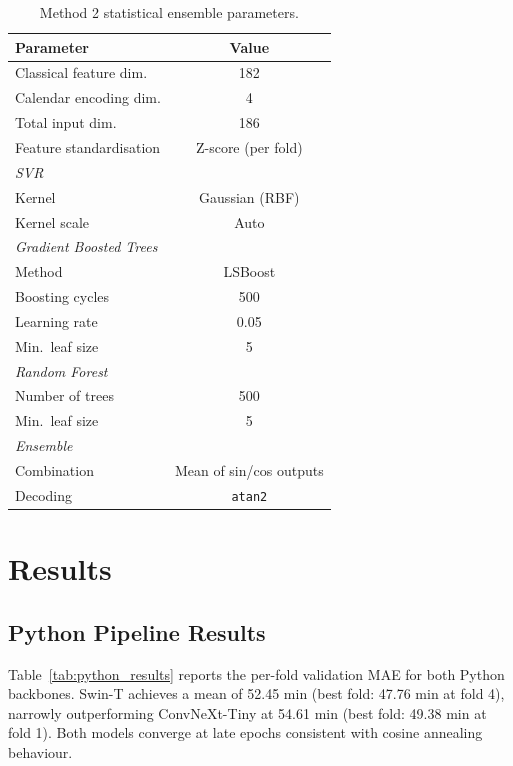 \documentclass[9pt, a4paper, twocolumn]{article}
\begin{document}
\begin{table}[H]
\centering
\footnotesize
\caption{Method 2 statistical ensemble parameters.}
\label{tab:m2_params}
\begin{tabular}{lc}
\toprule
\textbf{Parameter} & \textbf{Value} \\
\midrule
Classical feature dim.  & 182 \\
Calendar encoding dim.  & 4   \\
Total input dim.        & 186 \\
Feature standardisation & Z-score (per fold) \\
\midrule
\multicolumn{2}{l}{\textit{SVR}} \\
Kernel                  & Gaussian (RBF) \\
Kernel scale            & Auto \\
\midrule
\multicolumn{2}{l}{\textit{Gradient Boosted Trees}} \\
Method                  & LSBoost \\
Boosting cycles         & 500 \\
Learning rate           & 0.05 \\
Min.\ leaf size         & 5 \\
\midrule
\multicolumn{2}{l}{\textit{Random Forest}} \\
Number of trees         & 500 \\
Min.\ leaf size         & 5 \\
\midrule
\multicolumn{2}{l}{\textit{Ensemble}} \\
Combination             & Mean of sin/cos outputs \\
Decoding                & \texttt{atan2} \\
\bottomrule
\end{tabular}
\end{table}

\section{Results}
\label{sec:results}

\subsection{Python Pipeline Results}

Table~\ref{tab:python_results} reports the per-fold validation MAE for both Python backbones. Swin-T achieves a mean of 52.45 min (best fold: 47.76 min at fold 4), narrowly outperforming ConvNeXt-Tiny at 54.61 min (best fold: 49.38 min at fold 1). Both models converge at late epochs consistent with cosine annealing behaviour.
\end{document}
